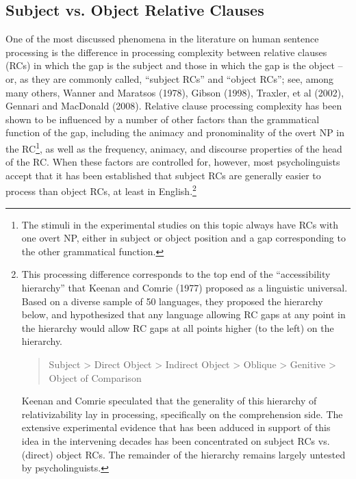 \documentclass[a4paper]{article}
\begin{document}
\subsection{Subject vs. Object Relative Clauses}

One of the most discussed phenomena in the literature on human sentence processing is the difference in processing complexity between relative clauses (RCs) in which the gap is the subject and those in which the gap is the object -- or, as they are commonly called, ``subject RCs'' and ``object RCs''; see, among many others, Wanner and Maratsos (1978), Gibson (1998), Traxler, et al (2002), Gennari and MacDonald (2008).  Relative clause processing complexity has been shown to be influenced by a number of other factors than the grammatical function of the gap, including the animacy and pronominality of the overt NP in the RC\footnote{The stimuli in the experimental studies on this topic always have RCs with one overt NP, either in subject or object position and a gap corresponding to the other grammatical function.}, as well as the frequency, animacy, and discourse properties of the head of the RC.  When these factors are controlled for, however, most psycholinguists accept that it has been established that subject RCs are generally easier to process than object RCs, at least in English.\footnote{This processing difference corresponds to the top end of the ``accessibility hierarchy'' that Keenan and Comrie (1977) proposed as a linguistic universal. Based on a diverse sample of 50 languages, they proposed the hierarchy below, and hypothesized that any language allowing RC gaps at any point in the hierarchy would allow RC gaps at all points higher (to the left) on the hierarchy.
\begin{quote}

Subject 
> 
Direct Object 
> 
Indirect Object 
> 
Oblique 
> 
Genitive
> 
Object of Comparison
\end{quote}
Keenan and Comrie speculated that the generality of this hierarchy of relativizability lay in processing, specifically on the comprehension side.  The extensive experimental evidence that has been adduced in support of this idea in the intervening decades has been concentrated on subject RCs vs. (direct) object RCs.  The remainder of the hierarchy remains largely untested by psycholinguists.}
\end{document}
